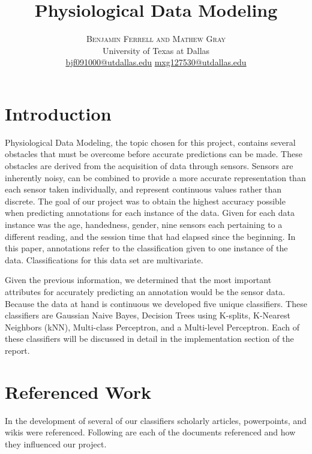 \documentclass[twoside]{article}
\title{\vspace{-15mm}\fontsize{24pt}{10pt}\selectfont\textbf{Physiological Data Modeling}} %
\author{
\large
\textsc{Benjamin Ferrell and Mathew Gray}\\[2mm] %
\normalsize University of Texas at Dallas \\ %
\normalsize \href{mailto:bjf091000@utdallas.edu}{bjf091000@utdallas.edu}  \href{mailto:mxg127530@utdallas.edu}{mxg127530@utdallas.edu} %
\vspace{-5mm}
}
\date{}
\begin{document}
\maketitle %

\thispagestyle{fancy} %

\begin{multicols}{2}


\section{Introduction}

Physiological Data Modeling, the topic chosen for this project, contains several obstacles that must be overcome before accurate predictions can be made.  These obstacles are derived from the acquisition of data through sensors.  Sensors are inherently noisy, can be combined to provide a more accurate representation than each sensor taken individually, and represent continuous values rather than discrete.  The goal of our project was to obtain the highest accuracy possible when predicting annotations for each instance of the data.  Given for each data instance was the age, handedness, gender, nine sensors each pertaining to a different reading, and the session time that had elapsed since the beginning.  In this paper, annotations refer to the classification given to one instance of the data.  Classifications for this data set are multivariate.

Given the previous information, we determined that the most important attributes for accurately predicting an annotation would be the sensor data.  Because the data at hand is continuous we developed five unique classifiers.  These classifiers are Gaussian Naive Bayes, Decision Trees using K-splits, K-Nearest Neighbors (kNN), Multi-class Perceptron, and a Multi-level Perceptron.  Each of these classifiers will be discussed in detail in the implementation section of the report.

\section{Referenced Work}

In the development of several of our classifiers scholarly articles, powerpoints, and wikis were referenced.  Following are each of the documents referenced and how they influenced our project.


\end{multicols}
\end{document}
